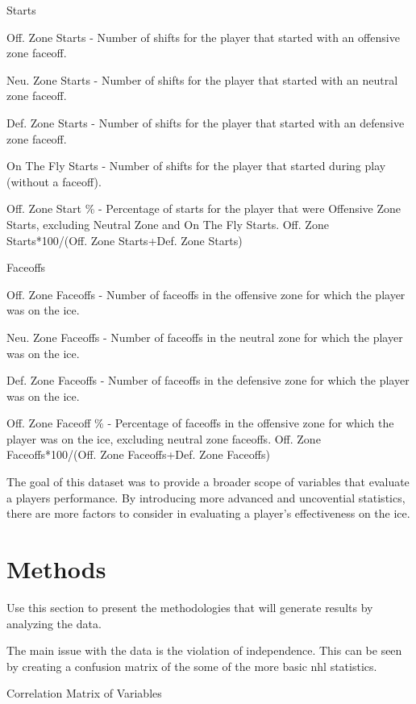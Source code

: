 \documentclass[12pt]{article}
\begin{document}
Starts

Off. Zone Starts - Number of shifts for the player that started with an offensive zone faceoff.

Neu. Zone Starts - Number of shifts for the player that started with an neutral zone faceoff.

Def. Zone Starts - Number of shifts for the player that started with an defensive zone faceoff.

On The Fly Starts - Number of shifts for the player that started during play (without a faceoff).

Off. Zone Start \% - Percentage of starts for the player that were Offensive Zone Starts, excluding Neutral Zone and On The Fly Starts. Off. Zone Starts*100/(Off. Zone Starts+Def. Zone Starts)

Faceoffs

Off. Zone Faceoffs - Number of faceoffs in the offensive zone for which the player was on the ice.

Neu. Zone Faceoffs - Number of faceoffs in the neutral zone for which the player was on the ice.

Def. Zone Faceoffs - Number of faceoffs in the defensive zone for which the player was on the ice.

Off. Zone Faceoff \% - Percentage of faceoffs in the offensive zone for which the player was on the ice, excluding neutral zone faceoffs. Off. Zone Faceoffs*100/(Off. Zone Faceoffs+Def. Zone Faceoffs)

The goal of this dataset was to provide a broader scope of variables that evaluate a players performance. By introducing more
advanced and uncovential statistics, there are more factors to consider in evaluating a player's effectiveness on the ice.


\section{Methods}
\label{sec:meth}

Use this section to present the methodologies that will generate results by
analyzing the data. 

The main issue with the data is the violation of independence. This can be seen by creating a confusion matrix of the some 
of the more basic nhl statistics. 

\begin{table}[h!]
  \centering
  \caption{Correlation Matrix of Variables}
  
  \label{tab:correlation_matrix}
\end{table}
\end{document}
